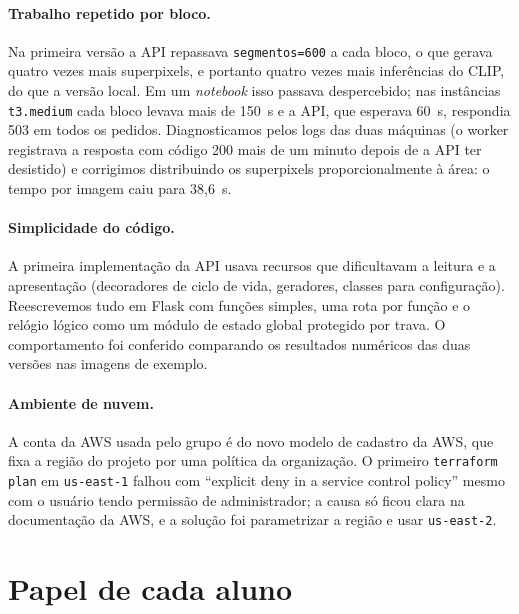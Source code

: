 \documentclass{sbc2023}
\begin{document}
\paragraph{Trabalho repetido por bloco.} Na primeira versão a API repassava \texttt{segmentos=600} a cada bloco, o que gerava quatro vezes mais superpixels, e portanto quatro vezes mais inferências do CLIP, do que a versão local. Em um \emph{notebook} isso passava despercebido; nas instâncias \texttt{t3.medium} cada bloco levava mais de 150~s e a API, que esperava 60~s, respondia 503 em todos os pedidos. Diagnosticamos pelos logs das duas máquinas (o worker registrava a resposta com código 200 mais de um minuto depois de a API ter desistido) e corrigimos distribuindo os superpixels proporcionalmente à área: o tempo por imagem caiu para 38{,}6~s.

\paragraph{Simplicidade do código.} A primeira implementação da API usava recursos que dificultavam a leitura e a apresentação (decoradores de ciclo de vida, geradores, classes para configuração). Reescrevemos tudo em Flask com funções simples, uma rota por função e o relógio lógico como um módulo de estado global protegido por trava. O comportamento foi conferido comparando os resultados numéricos das duas versões nas imagens de exemplo.

\paragraph{Ambiente de nuvem.} A conta da AWS usada pelo grupo é do novo modelo de cadastro da AWS, que fixa a região do projeto por uma política da organização. O primeiro \texttt{terraform plan} em \texttt{us-east-1} falhou com ``explicit deny in a service control policy'' mesmo com o usuário tendo permissão de administrador; a causa só ficou clara na documentação da AWS, e a solução foi parametrizar a região e usar \texttt{us-east-2}.

\section{Papel de cada aluno}
\label{sec:papeis}
\end{document}
